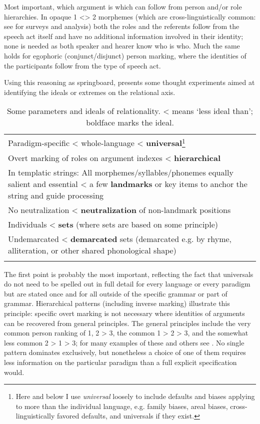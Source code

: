 \documentclass[output=paper,hidelinks]{langscibook}
\begin{document}
Most important, which argument is which can follow from person and/or role hierarchies.  In opaque 1 <> 2 morphemes (which are cross-linguistically common: see \citealt{Heath1991,Heath1998} for surveys and analysis) both the roles and the referents follow from the speech act itself and have no additional information involved in their identity; none is needed as both speaker and hearer know who is who.  Much the same holds for egophoric (conjunct/disjunct) person marking, where the identities of the participants follow from the type of speech act.

Using this reasoning as springboard,  presents some thought experiments aimed at identifying the ideals or extremes on the relational axis.

\begin{table}
\caption{Some parameters and ideals of relationality.  < means ‘less ideal than’; boldface marks the ideal.\label{tab7}}
\begin{tabularx}{\textwidth}{Q}
\lsptoprule
Paradigm-specific < whole-language < \textbf{universal}\footnote{Here and below I use \textit{universal} loosely to include defaults and biases applying to more than the individual language, e.g. family biases, areal biases, cross-linguistically favored defaults, and universals if they exist.} \\ \tablevspace
Overt marking of roles on argument indexes < \textbf{hierarchical}  \\ \tablevspace
In templatic strings:    All morphemes/syllables/phonemes equally salient and essential  < a few \textbf{landmarks} or key items to anchor the string and guide processing  \\ \tablevspace
No neutralization < \textbf{neutralization} of non-landmark positions \\ \tablevspace
Individuals < \textbf{sets}  (where sets are based on some principle) \\ \tablevspace
Undemarcated < \textbf{demarcated} sets  (demarcated e.g. by rhyme, alliteration, or other shared phonological shape) \\
\lspbottomrule
\end{tabularx}
\end{table}

The first point is probably the most important, reflecting the fact that universals do not need to be spelled out in full detail for every language or every paradigm but are stated once and for all outside of the specific grammar or part of grammar.  Hierarchical patterns (including inverse marking) illustrate this principle: specific overt marking is not necessary where identities of arguments can be recovered from general principles.  The general principles include the very common person ranking of 1, 2 > 3, the common 1 > 2 > 3, and the somewhat less common 2 > 1 > 3; for many examples of these and others see \citet{Zuniga2006}.  No single pattern dominates exclusively, but nonetheless a choice of one of them requires less information on the particular paradigm than a full explicit specification would.  
\end{document}
